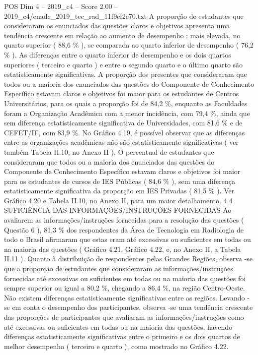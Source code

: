 \begin{textsample}{POS Dim 4 – 2019\_c4 – Score 2.00 – 2019\_c4/enade\_2019\_tec\_rad\_11f9cf2c70.txt}
A proporção de estudantes que consideraram os enunciados das questões claros e objetivos apresenta uma tendência crescente em relação ao aumento de desempenho : mais elevada, no quarto superior ( 88,6 \% ), se comparada ao quarto inferior de desempenho ( 76,2 \% ).
As diferenças entre o quarto inferior de desempenho e os dois quartos superiores ( terceiro e quarto ) e entre o segundo quarto e o último quarto são estatisticamente significativas.
A proporção dos presentes que consideraram que todos ou a maioria dos enunciados das questões do Componente de Conhecimento Específico estavam claros e objetivos foi maior para os estudantes de Centros Universitários, para os quais a proporção foi de 84,2 \%, enquanto as Faculdades foram a Organização Acadêmica com a menor incidência, com 79,4 \%, ainda que sem diferença estatisticamente significativa de Universidades, com 81,6 \% e de CEFET/IF, com 83,9 \%.
No Gráfico 4.19, é possível observar que as diferenças entre as organizações acadêmicas não são estatisticamente significativas ( ver também Tabela II.10, no Anexo II ).
O percentual de estudantes que consideraram que todos ou a maioria dos enunciados das questões do Componente de Conhecimento Específico estavam claros e objetivos foi maior para os estudantes de cursos de IES Públicas ( 84,6 \% ), sem uma diferença estatisticamente significativa da proporção em IES Privadas ( 81,5 \% ).
Ver Gráfico 4.20 e Tabela II.10, no Anexo II, para um maior detalhamento. 4.4 SUFICIÊNCIA DAS INFORMAÇÕES/INSTRUÇÕES FORNECIDAS Ao avaliarem as informações/instruções fornecidas para a resolução das questões ( Questão 6 ), 81,3 \% dos respondentes da Área de Tecnologia em Radiologia de todo o Brasil afirmaram que estas eram até excessivas ou suficientes em todas ou na maioria das questões ( Gráfico 4.21, Gráfico 4.22, e, no Anexo II, a Tabela II.11 ).
Quanto à distribuição de respondentes pelas Grandes Regiões, observa -se que a proporção de estudantes que consideraram as informações/instruções fornecidas até excessivas ou suficientes em todas ou na maioria das questões foi sempre superior ou igual a 80,2 \%, chegando a 86,4 \%, na região Centro-Oeste.
Não existem diferenças estatisticamente significativas entre as regiões.
Levando -se em conta o desempenho dos participantes, observa -se uma tendência crescente das proporções de participantes que avaliaram as informações/instruções como até excessivas ou suficientes em todas ou na maioria das questões, havendo diferenças estatisticamente significativas entre o primeiro e os dois quartos de melhor desempenho ( terceiro e quarto ), como mostrado no Gráfico 4.22.

\end{textsample}
